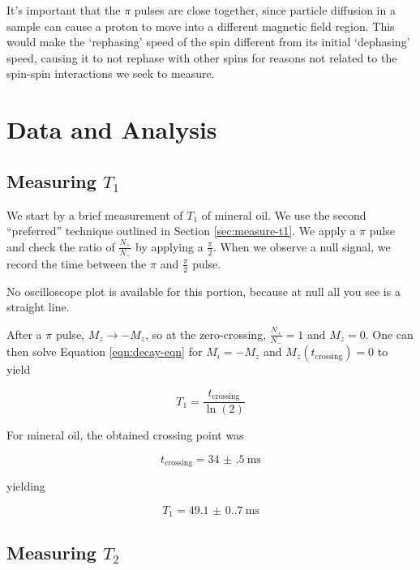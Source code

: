 \documentclass[
    floatfix,  %
    reprint,
    amsmath,amssymb,
    aps,
]{revtex4-2}
\newcommand{\halfpi}{\frac{\pi}{2}}
\begin{document}
It's important that the $\pi$ pulses are close together, since particle diffusion in a sample can cause a proton to move into a different magnetic field region. This would make the `rephasing' speed of the spin different from its initial `dephasing' speed, causing it to not rephase with other spins for reasons not related to the spin-spin interactions we seek to measure.

\section{Data and Analysis}

\subsection{Measuring $T_1$}

We start by a brief measurement of $T_1$ of mineral oil. We use the second ``preferred'' technique outlined in Section \ref{sec:measure-t1}. We apply a $\pi$ pulse and check the ratio of $\frac{N_+}{N_-}$ by applying a $\halfpi$. When we observe a null signal, we record the time between the $\pi$ and $\halfpi$ pulse.

No oscilloscope plot is available for this portion, because at null all you see is a straight line.

After a $\pi$ pulse, $M_z \rightarrow -M_z$, so at the zero-crossing, $\frac{N_+}{N_-} = 1$ and $M_z = 0$. One can then solve Equation \ref{eqn:decay-eqn} for $M_i = -M_z$ and $M_z(t_\text{crossing}) = 0$ to yield

\begin{equation}
    T_1 = \frac{t_\text{crossing}}{\ln(2)}
\end{equation}

For mineral oil, the obtained crossing point was

\begin{equation}
    t_\text{crossing} = \SI[separate-uncertainty = true]{34(.5)}{\milli\second}
\end{equation}

yielding

\begin{equation}
    T_1 = \SI[separate-uncertainty=true]{49.1(0.7)}{\milli\second}
\end{equation}

\subsection{Measuring $T_2$}
\end{document}
